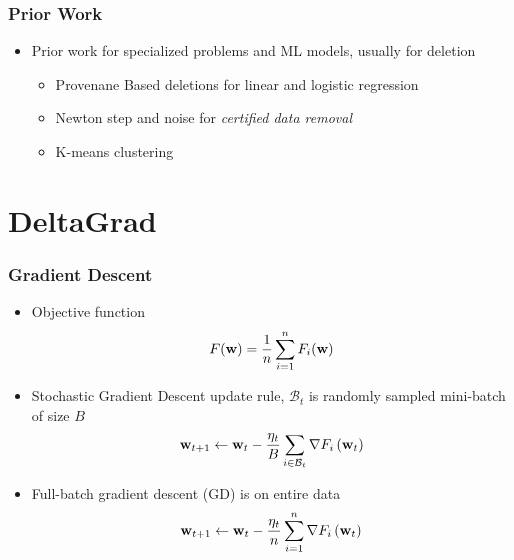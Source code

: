 \documentclass{beamer}
\begin{document}
\begin{frame}
  \frametitle{Prior Work}
  \begin{itemize}
    \item Prior work for specialized problems and ML models, usually for deletion
    \begin{itemize}
      \item Provenane Based deletions for linear and logistic regression \cite{wuPrIUProvenanceBasedApproach2020}
      \item Newton step and noise for \textit{certified data removal} \cite{guoCertifiedDataRemoval2020}
      \item K-means clustering \cite{ginartMakingAIForget2019}
    \end{itemize}
  \end{itemize}
\end{frame}

\section{DeltaGrad}
\begin{frame}
  \frametitle{Gradient Descent}
  \begin{itemize}
    \item Objective function  
    \[
        F(\textbf{w}) = \frac{1}{n}\sum_{i=1}^{n}F_{i}(\textbf{w})  
    \]
    \item Stochastic Gradient Descent update rule, $\mathcal{B}_{t}$ is randomly sampled mini-batch of size $B$
    \[
      \textbf{w}_{t+1} \leftarrow \textbf{w}_{t}-\frac{\eta_{t}}{B} \sum_{i \in \mathcal{B}_{t}} \nabla F_{i}\left(\textbf{w}_{t}\right) 
    \]
    \item Full-batch gradient descent (GD) is on entire data 
    \[
      \textbf{w}_{t+1} \leftarrow \textbf{w}_{t}-\frac{\eta_{t}}{n} \sum_{i=1}^{n} \nabla F_{i}\left(\textbf{w}_{t}\right) 
    \]
  \end{itemize} 
\end{frame}
\end{document}
